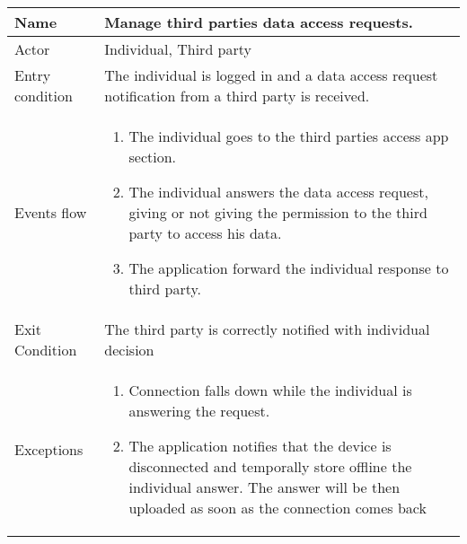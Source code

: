 \begin{tabular}{|l|p{13cm}|}
    \hline
    Name & Manage third parties data access requests.
    \\ \hline
    Actor & Individual, Third party
    \\ \hline 
    Entry condition & The individual is logged in and a data access request notification from a third party is received.
    \\ \hline
    Events flow &
    \begin{enumerate}
	\item The individual goes to the third parties access app section.
    \item The individual answers the data access request, giving or not giving the permission to the third party to access his data.
    \item The application forward the individual response to third party.
    \end{enumerate}
     \\ \hline
     Exit Condition & The third party is correctly notified with individual decision
     \\
    \hline
    Exceptions &
        \begin{enumerate}
    \item Connection falls down while the individual is answering the request.
    \item The application notifies that the device is disconnected and temporally store offline the individual answer. The answer will be then uploaded as soon as the connection comes back
    \end{enumerate}
      \\
    \hline
\end{tabular}



